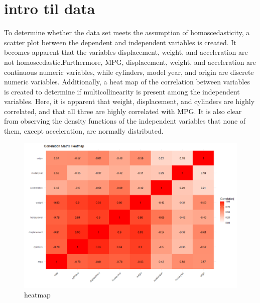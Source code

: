 


\lstset{style=mystyle}
	
	\section{intro til data }
	To determine whether the data set meets the assumption of homoscedasticity, a scatter plot between the dependent and independent variables is created. It becomes apparent that the variables displacement, weight, and acceleration are not homoscedastic.Furthermore, MPG, displacement, weight, and acceleration are continuous numeric variables, while cylinders, model year, and origin are discrete numeric variables. Additionally, a heat map of the correlation between variables is created to determine if multicollinearity is present among the independent variables. Here, it is apparent that weight, displacement, and cylinders are highly correlated, and that all three are highly correlated with MPG. It is also clear from observing the density functions of the independent variables that none of them, except acceleration, are normally distributed. 
%	



\begin{figure}[h] 
	\centering\includegraphics[width=14cm]{p2/1.png}
	\caption{heatmap}
	\label{fig:intro1}
\end{figure}


